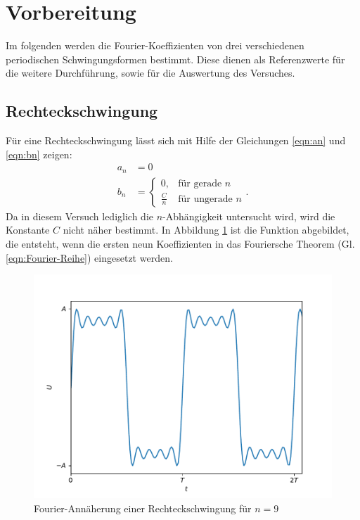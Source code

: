 \section{Vorbereitung}
Im folgenden werden die Fourier-Koeffizienten von drei verschiedenen periodischen Schwingungsformen bestimmt. Diese dienen als Referenzwerte für die weitere Durchführung, sowie für die Auswertung des Versuches.
\subsection{Rechteckschwingung}
Für eine Rechteckschwingung lässt sich mit Hilfe der Gleichungen \eqref{eqn:an} und \eqref{eqn:bn} zeigen:
\begin{align*}
    a_n &= 0 \\
    b_n &= 
    \begin{cases}
    0 ,     & \text {für gerade $n$} \\
    \frac{C}{n} & \text {für ungerade $n$}
    \end{cases} .
\end{align*}
Da in diesem Versuch lediglich die $n$-Abhängigkeit untersucht wird, wird die Konstante $C$ nicht näher bestimmt. In Abbildung \ref{fig:vorbereitung_rechteck} ist die Funktion abgebildet, die entsteht, wenn die ersten neun Koeffizienten in das Fouriersche Theorem (Gl. \eqref{eqn:Fourier-Reihe}) eingesetzt werden.
\begin{figure}[h]
  \centering
  \includegraphics[width=\textwidth]{assets/fourier_rechteck.pdf}
  \caption{Fourier-Annäherung einer Rechteckschwingung für $n=9$}
  \label{fig:vorbereitung_rechteck}
\end{figure}
